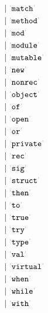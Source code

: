 \begin{align*}
      ~ \mid ~ &  \LEX{match} \\
      ~ \mid ~ &  \LEX{method} \\
      ~ \mid ~ &  \LEX{mod} \\
      ~ \mid ~ &  \LEX{module} \\
      ~ \mid ~ &  \LEX{mutable} \\
      ~ \mid ~ &  \LEX{new} \\
      ~ \mid ~ &  \LEX{nonrec} \\
      ~ \mid ~ &  \LEX{object} \\
      ~ \mid ~ &  \LEX{of} \\
      ~ \mid ~ &  \LEX{open} \\
      ~ \mid ~ &  \LEX{or} \\
      ~ \mid ~ &  \LEX{private} \\
      ~ \mid ~ &  \LEX{rec} \\
      ~ \mid ~ &  \LEX{sig} \\
      ~ \mid ~ &  \LEX{struct} \\
      ~ \mid ~ &  \LEX{then} \\
      ~ \mid ~ &  \LEX{to} \\
      ~ \mid ~ &  \LEX{true} \\
      ~ \mid ~ &  \LEX{try} \\
      ~ \mid ~ &  \LEX{type} \\
      ~ \mid ~ &  \LEX{val} \\
      ~ \mid ~ &  \LEX{virtual} \\
      ~ \mid ~ &  \LEX{when} \\
      ~ \mid ~ &  \LEX{while} \\
      ~ \mid ~ &  \LEX{with}
\end{align*}

